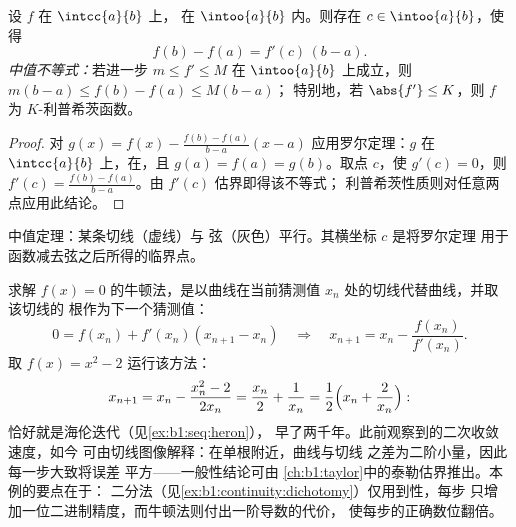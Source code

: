 \begin{theorem}[中值定理]\label{thm:b1:derivative:mvt}
设 $f$ 在 $\intcc{a}{b}$ 上，
在 $\intoo{a}{b}$ 内。则存在 $c \in \intoo{a}{b}$，使得
\[
f(b) - f(a) = f'(c)\,(b - a) .
\]
\emph{中值不等式：}若进一步 $m \leq f' \leq M$ 在
$\intoo{a}{b}$ 上成立，则 $m(b-a) \leq f(b) - f(a) \leq M(b-a)$；
特别地，若 $\abs{f'} \leq K$，则 $f$ 为 $K$-利普希茨函数。
\end{theorem}

\begin{proof}
对 $g(x) = f(x) - \frac{f(b) - f(a)}{b - a}(x - a)$ 应用罗尔定理：$g$
在 $\intcc{a}{b}$ 上，在，且 $g(a) =
f(a) = g(b)$。取点 $c$，使 $g'(c) = 0$，则 $f'(c) =
\frac{f(b)-f(a)}{b-a}$。由 $f'(c)$ 估界即得该不等式；
利普希茨性质则对任意两点应用此结论。
\end{proof}

\begin{omfigure}

{\small 中值定理：某条切线（虚线）与
弦（灰色）平行。其横坐标 $c$ 是将罗尔定理
用于函数减去弦之后所得的临界点。}
\end{omfigure}

\begin{example}[牛顿法即海伦迭代]\label{ex:b1:derivative:newton}
求解 $f(x) = 0$ 的牛顿法，是以曲线在当前猜测值
$x_n$ 处的切线代替曲线，并取该切线的
根作为下一个猜测值：
\[
0 = f(x_n) + f'(x_n)(x_{n+1} - x_n)
\quad\Longrightarrow\quad
x_{n+1} = x_n - \frac{f(x_n)}{f'(x_n)} .
\]
取 $f(x) = x^2 - 2$ 运行该方法：
\[
x_{n+1} = x_n - \frac{x_n^2 - 2}{2x_n}
= \frac{x_n}{2} + \frac{1}{x_n}
= \frac12\Bigl(x_n + \frac{2}{x_n}\Bigr) :
\]
恰好就是海伦迭代（见\cref{ex:b1:seq:heron}），
早了两千年。此前观察到的二次收敛速度，如今
可由切线图像解释：在单根附近，曲线与切线
之差为二阶小量，因此每一步大致将误差
平方——一般性结论可由
\cref{ch:b1:taylor}中的泰勒估界推出。本例的要点在于：
二分法（见\cref{ex:b1:continuity:dichotomy}）仅用到性，每步
只增加一位二进制精度，而牛顿法则付出一阶导数的代价，
使每步的正确数位翻倍。
\end{example}

